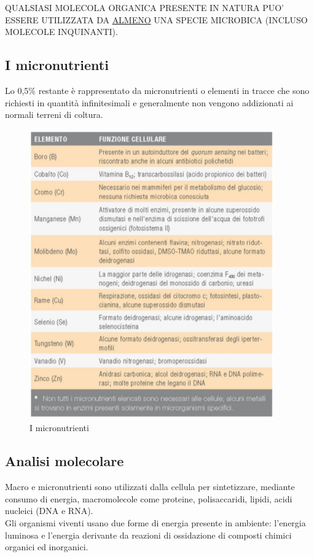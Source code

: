 \documentclass[11pt]{book}
\begin{document}
QUALSIASI MOLECOLA ORGANICA PRESENTE IN NATURA PUO’ ESSERE UTILIZZATA DA \underline{ALMENO} UNA SPECIE MICROBICA (INCLUSO MOLECOLE INQUINANTI).


\subsection{I micronutrienti}
Lo 0,5$\%$ restante è rappresentato da micronutrienti o elementi in tracce che sono richiesti in quantità infinitesimali e generalmente non vengono addizionati ai normali terreni di coltura.

\begin{figure}[htp]
\centering
\includegraphics[scale=0.5]{img/Micronutrienti.png}
\caption{I micronutrienti}
\label{}
\end{figure}

\subsection{Analisi molecolare}
Macro e micronutrienti sono utilizzati dalla cellula per sintetizzare, mediante consumo di energia, macromolecole come proteine, polisaccaridi, lipidi, acidi nucleici (DNA e RNA).\\
Gli organismi viventi usano due forme di energia presente in ambiente: l’energia luminosa e l’energia derivante da reazioni di ossidazione di composti chimici organici ed inorganici.
\end{document}
